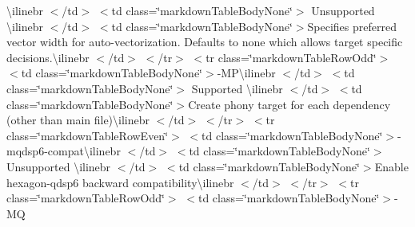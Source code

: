 \begin{longtabu}
{\ttfamily \textbackslash{}ilinebr \texorpdfstring{$<$}{<}/td\texorpdfstring{$>$}{>} \texorpdfstring{$<$}{<}td class=\char`\"{}markdown\+Table\+Body\+None\char`\"{}\texorpdfstring{$>$}{>} Unsupported \textbackslash{}ilinebr \texorpdfstring{$<$}{<}/td\texorpdfstring{$>$}{>} \texorpdfstring{$<$}{<}td class=\char`\"{}markdown\+Table\+Body\+None\char`\"{}\texorpdfstring{$>$}{>}}Specifies preferred vector width for auto-\/vectorization. Defaults to \textquotesingle{}none\textquotesingle{} which allows target specific decisions.{\ttfamily \textbackslash{}ilinebr \texorpdfstring{$<$}{<}/td\texorpdfstring{$>$}{>} \texorpdfstring{$<$}{<}/tr\texorpdfstring{$>$}{>} \texorpdfstring{$<$}{<}tr class=\char`\"{}markdown\+Table\+Row\+Odd\char`\"{}\texorpdfstring{$>$}{>} \texorpdfstring{$<$}{<}td class=\char`\"{}markdown\+Table\+Body\+None\char`\"{}\texorpdfstring{$>$}{>}}-\/MP{\ttfamily \textbackslash{}ilinebr \texorpdfstring{$<$}{<}/td\texorpdfstring{$>$}{>} \texorpdfstring{$<$}{<}td class=\char`\"{}markdown\+Table\+Body\+None\char`\"{}\texorpdfstring{$>$}{>} Supported \textbackslash{}ilinebr \texorpdfstring{$<$}{<}/td\texorpdfstring{$>$}{>} \texorpdfstring{$<$}{<}td class=\char`\"{}markdown\+Table\+Body\+None\char`\"{}\texorpdfstring{$>$}{>}}Create phony target for each dependency (other than main file){\ttfamily \textbackslash{}ilinebr \texorpdfstring{$<$}{<}/td\texorpdfstring{$>$}{>} \texorpdfstring{$<$}{<}/tr\texorpdfstring{$>$}{>} \texorpdfstring{$<$}{<}tr class=\char`\"{}markdown\+Table\+Row\+Even\char`\"{}\texorpdfstring{$>$}{>} \texorpdfstring{$<$}{<}td class=\char`\"{}markdown\+Table\+Body\+None\char`\"{}\texorpdfstring{$>$}{>}}-\/mqdsp6-\/compat{\ttfamily \textbackslash{}ilinebr \texorpdfstring{$<$}{<}/td\texorpdfstring{$>$}{>} \texorpdfstring{$<$}{<}td class=\char`\"{}markdown\+Table\+Body\+None\char`\"{}\texorpdfstring{$>$}{>} Unsupported \textbackslash{}ilinebr \texorpdfstring{$<$}{<}/td\texorpdfstring{$>$}{>} \texorpdfstring{$<$}{<}td class=\char`\"{}markdown\+Table\+Body\+None\char`\"{}\texorpdfstring{$>$}{>}}Enable hexagon-\/qdsp6 backward compatibility{\ttfamily \textbackslash{}ilinebr \texorpdfstring{$<$}{<}/td\texorpdfstring{$>$}{>} \texorpdfstring{$<$}{<}/tr\texorpdfstring{$>$}{>} \texorpdfstring{$<$}{<}tr class=\char`\"{}markdown\+Table\+Row\+Odd\char`\"{}\texorpdfstring{$>$}{>} \texorpdfstring{$<$}{<}td class=\char`\"{}markdown\+Table\+Body\+None\char`\"{}\texorpdfstring{$>$}{>}}-\/MQ 


\end{longtabu}
